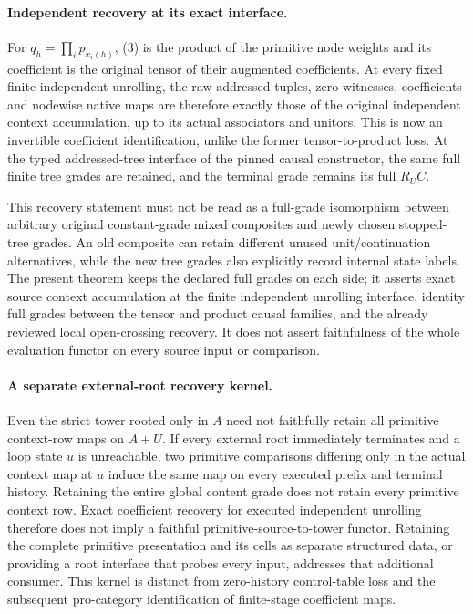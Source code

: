 \documentclass[11pt]{article}
\begin{document}
\paragraph{Independent recovery at its exact interface.}
For $q_h=\prod_i p_{x_i(h)}$, (3) is the product of the primitive node weights and its coefficient is the original tensor of their augmented coefficients. At every fixed finite independent unrolling, the raw addressed tuples, zero witnesses, coefficients and nodewise native maps are therefore exactly those of the original independent context accumulation, up to its actual associators and unitors. This is now an invertible coefficient identification, unlike the former tensor-to-product loss. At the typed addressed-tree interface of the pinned causal constructor, the same full finite tree grades are retained, and the terminal grade remains its full $R_UC$.

This recovery statement must not be read as a full-grade isomorphism between arbitrary original constant-grade mixed composites and newly chosen stopped-tree grades. An old composite can retain different unused unit/continuation alternatives, while the new tree grades also explicitly record internal state labels. The present theorem keeps the declared full grades on each side; it asserts exact source context accumulation at the finite independent unrolling interface, identity full grades between the tensor and product causal families, and the already reviewed local open-crossing recovery. It does not assert faithfulness of the whole evaluation functor on every source input or comparison.

\paragraph{A separate external-root recovery kernel.}
Even the strict tower rooted only in $A$ need not faithfully retain all primitive context-row maps on $A+U$. If every external root immediately terminates and a loop state $u$ is unreachable, two primitive comparisons differing only in the actual context map at $u$ induce the same map on every executed prefix and terminal history. Retaining the entire global content grade does not retain every primitive context row. Exact coefficient recovery for executed independent unrolling therefore does not imply a faithful primitive-source-to-tower functor. Retaining the complete primitive presentation and its cells as separate structured data, or providing a root interface that probes every input, addresses that additional consumer. This kernel is distinct from zero-history control-table loss and the subsequent pro-category identification of finite-stage coefficient maps.
\end{document}
